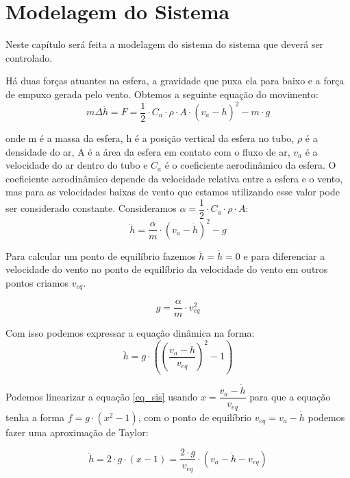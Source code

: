 \chapter{Modelagem do Sistema} \label{cap3}

Neste capítulo será feita a modelagem do sistema do sistema que deverá ser controlado.

\label{fig:sistemasimples}

Há duas forças atuantes na esfera, a gravidade que puxa ela para baixo e a força de empuxo gerada pelo vento. Obtemos a seguinte equação do movimento:
\begin{equation}
m\Delta \ddot{h}=F=\dfrac{1}{2} \cdot C_a \cdot\rho \cdot A \cdot (v_a- \dot{h})^2-m\cdot g
\end{equation}

onde m é a massa da esfera, h é a posição vertical da esfera no tubo, $\rho$ é a densidade do ar, A é a área da esfera em contato com o fluxo de ar, $v_a$ é a velocidade do ar dentro do tubo e $C_a$ é o coeficiente aerodinâmico da esfera. O coeficiente aerodinâmico depende da velocidade relativa entre a esfera e o vento, mas para as velocidades baixas de vento que estamos utilizando esse valor pode ser considerado constante. Consideramos $\alpha= \dfrac{1}{2} \cdot C_a \cdot \rho \cdot A$:
\begin{equation}
\ddot{h}=\dfrac{\alpha}{m}\cdot (v_a-\dot{h})^2-g
\end{equation}

Para calcular um ponto de equilíbrio fazemos $\ddot{h}=\dot{h}=0$ e para diferenciar a velocidade do vento no ponto de equilíbrio da velocidade do vento em outros pontos criamos $v_{eq}$.

\begin{equation}
g=\dfrac{\alpha}{m}\cdot v_{eq}^2
\end{equation}

Com isso podemos expressar a equação dinâmica na forma:
\begin{equation} \label{eq_sis}
\ddot{h}=g\cdot \left( \left(\dfrac{v_a-\dot{h}}{v_{eq}} \right)^2 -1\right)
\end{equation}

Podemos linearizar a equação \ref{eq_sis} usando $x=\dfrac{v_a-\dot{h}}{v_{eq}}$ para que a equação tenha a forma $f=g \cdot (x^2-1)$, com o ponto de equilíbrio $v_{eq}=v_a-\dot{h}$ podemos fazer uma aproximação de Taylor:

\begin{equation}
\ddot{h}=2 \cdot g \cdot (x-1) = \dfrac{2 \cdot g}{v_{eq}} \cdot (v_a - \dot{h} - v_{eq})
\end{equation}

